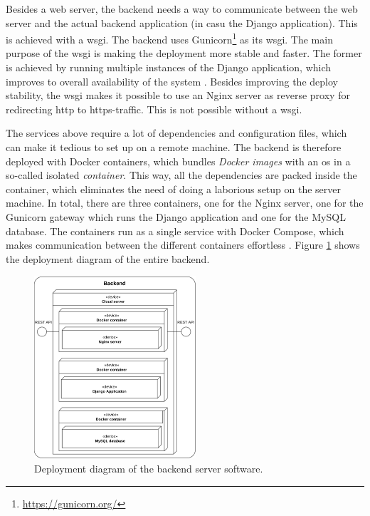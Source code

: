 \ind Besides a web server, the backend needs a way to communicate between the web server and the actual backend application (in casu the Django application). This is achieved with a \ac{wsgi}. The backend uses Gunicorn\footnote{\url{https://gunicorn.org/}} as its \ac{wsgi}. The main purpose of the \ac{wsgi} is making the deployment more stable and faster. The former is achieved by running multiple instances of the Django application, which improves to overall availability of the system \cite{gunicorn}. Besides improving the deploy stability, the \ac{wsgi} makes it possible to use an Nginx server as reverse proxy for redirecting \ac{http} to \ac{https}-traffic. This is not possible without a \ac{wsgi}.

\ind The services above require a lot of dependencies and configuration files, which can make it tedious to set up on a remote machine. The backend is therefore deployed with Docker containers, which bundles \textit{Docker images} with an \ac{os} in a so-called isolated \textit{container}. This way, all the dependencies are packed inside the container, which eliminates the need of doing a laborious setup on the server machine. In total, there are three containers, one for the Nginx server, one for the Gunicorn gateway which runs the Django application and one for the MySQL database. The containers run as a single service with Docker Compose, which makes communication between the different containers effortless \cite{docker-compose}. Figure \ref{fig:deployment-backend} shows the deployment diagram of the entire backend.

\begin{figure}[htp]
    \centering
    \includegraphics[width=6cm]{images/deployment_diagram_backend.drawio.png}
    \caption{Deployment diagram of the backend server software.}
    \label{fig:deployment-backend}
\end{figure}


